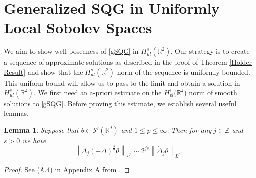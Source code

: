 \documentclass[12pt,xcolor=svgnames]{amsart}
\newtheorem{lemma}[theorem]{Lemma}
\newcommand{\R}{\mathbb{R}}
\newcommand{\norm}[2]{\left\lVert#1\right\rVert_{#2}}
\begin{document}
\section{Generalized SQG in Uniformly Local Sobolev Spaces}
We aim to show well-posedness of \eqref{gSQG} in $H^s_{ul}(\R^2)$. Our strategy is to create a sequence of approximate solutions as described in the proof of Theorem \ref{Holder Result} and show that the $H_{ul}^s(\R^2)$ norm of the sequence is uniformly bounded. This uniform bound will allow us to pass to the limit and obtain a solution in $H^s_{ul}(\R^2)$. We first need an a-priori estimate on the $H_{ul}^s(\R^2$) norm of smooth solutions to \eqref{gSQG}. Before proving this estimate, we establish several useful lemmas.

\begin{lemma}
\label{Bernstein for Riesz Potentital}
Suppose that $\theta \in \mathcal{S}'(\R^d)$ and $1\leq p \leq \infty$. Then for any $j \in \mathbb{Z}$ and $s>0$ we have 
\begin{equation} 
\norm{\dot{\Delta}_j (-\Delta)^{\frac{s}{2}}\theta}{L^p} \sim 2^{js}\norm{\dot{\Delta}_j \theta}{L^p}.
\end{equation}
\end{lemma}
\begin{proof}
See (A.4) in Appendix A from \cite{13}.
\end{proof}
\end{document}
